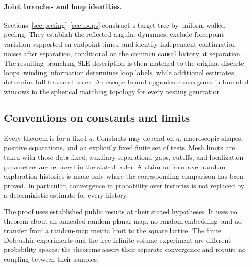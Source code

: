 \paragraph{Joint branches and loop identities.}
Sections~\ref{sec:peeling}--\ref{sec:loops} construct a target tree by
uniform-walled peeling.  They establish the reflected angular dynamics,
exclude forcepoint variation supported on endpoint times, and identify
independent continuation noises after separation, conditional on the
common causal history at separation.  The resulting branching SLE description is then matched
to the original discrete loops: winding information determines loop
labels, while additional estimates determine full traversal order.
An escape bound upgrades convergence in bounded windows to the
spherical matching topology for every nesting generation.

\subsection{Conventions on constants and limits}

Every theorem is for a fixed $q$.  Constants may depend on $q$,
macroscopic shapes, positive separations, and an explicitly fixed
finite set of tests.  Mesh limits are taken with those data fixed;
auxiliary separations, gaps, cutoffs, and localization parameters are
removed in the stated order.  A claim uniform over random exploration
histories is made only where the corresponding comparison has been
proved.  In particular, convergence in probability over histories is
not replaced by a deterministic estimate for every history.

The proof uses established public results at their stated hypotheses.
It uses no theorem about an annealed random planar map, no random
embedding, and no transfer from a random-map metric limit to the square
lattice.  The finite Dobrushin experiments and the free infinite-volume
experiment are different probability spaces; the theorems assert their
separate convergence and require no coupling between their samples.
